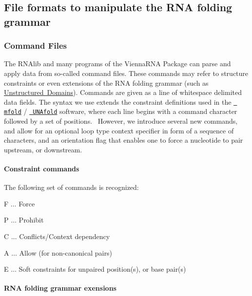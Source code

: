 \hypertarget{file_formats_constraint-formats}{}\subsection{File formats to manipulate the R\+N\+A folding grammar}\label{file_formats_constraint-formats}
\hypertarget{file_formats_constraint-formats-file}{}\subsubsection{Command Files}\label{file_formats_constraint-formats-file}
The R\+N\+Alib and many programs of the Vienna\+R\+NA Package can parse and apply data from so-\/called command files. These commands may refer to structure constraints or even extensions of the R\+NA folding grammar (such as \mbox{\hyperlink{group__domains__up}{Unstructured Domains}}). Commands are given as a line of whitespace delimited data fields. The syntax we use extends the constraint definitions used in the \href{http://mfold.rna.albany.edu/?q=mfold}{\texttt{ mfold}} / \href{http://mfold.rna.albany.edu/?q=DINAMelt/software}{\texttt{ U\+N\+Afold}} software, where each line begins with a command character followed by a set of positions.~\newline
However, we introduce several new commands, and allow for an optional loop type context specifier in form of a sequence of characters, and an orientation flag that enables one to force a nucleotide to pair upstream, or downstream.\hypertarget{file_formats_constraint_commands}{}\paragraph{Constraint commands}\label{file_formats_constraint_commands}
The following set of commands is recognized\+:
\begin{DoxyItemize}
\item {\ttfamily F} $ \ldots $ Force
\item {\ttfamily P} $ \ldots $ Prohibit
\item {\ttfamily C} $ \ldots $ Conflicts/\+Context dependency
\item {\ttfamily A} $ \ldots $ Allow (for non-\/canonical pairs)
\item {\ttfamily E} $ \ldots $ Soft constraints for unpaired position(s), or base pair(s)
\end{DoxyItemize}\hypertarget{file_formats_domain_commands}{}\paragraph{R\+N\+A folding grammar exensions}\label{file_formats_domain_commands}

